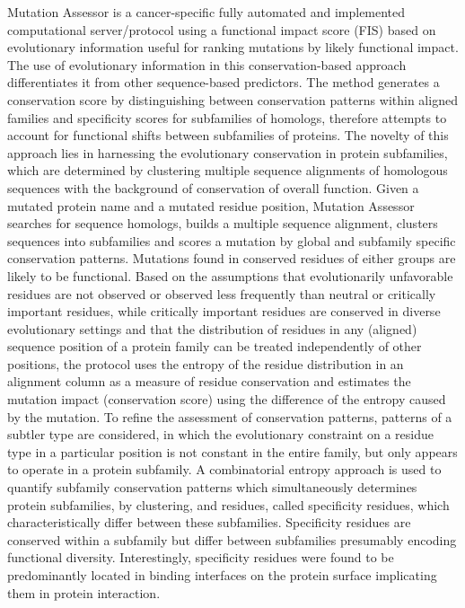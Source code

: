 \documentclass{article}
\begin{document}
Mutation Assessor is a cancer-specific fully automated and implemented
computational server/protocol using a functional impact score (FIS)
based on evolutionary information useful for ranking mutations by
likely functional impact. The use of evolutionary information in this
conservation-based approach differentiates it from other
sequence-based predictors.  The method generates a conservation score
by distinguishing between conservation patterns within aligned
families and specificity scores for subfamilies of homologs, therefore
attempts to account for functional shifts between subfamilies of
proteins. The novelty of this approach lies in harnessing the
evolutionary conservation in protein subfamilies, which are determined
by clustering multiple sequence alignments of homologous sequences
with the background of conservation of overall function. Given a
mutated protein name and a mutated residue position, Mutation Assessor
searches for sequence homologs, builds a multiple sequence alignment,
clusters sequences into subfamilies and scores a mutation by global
and subfamily specific conservation patterns. Mutations found in
conserved residues of either groups are likely to be functional. Based
on the assumptions that evolutionarily unfavorable residues are not
observed or observed less frequently than neutral or critically
important residues, while critically important residues are conserved
in diverse evolutionary settings and that the distribution of residues
in any (aligned) sequence position of a protein family can be treated
independently of other positions, the protocol uses the entropy of the
residue distribution in an alignment column as a measure of residue
conservation and estimates the mutation impact (conservation score)
using the difference of the entropy caused by the mutation. To refine
the assessment of conservation patterns, patterns of a subtler type
are considered, in which the evolutionary constraint on a residue type
in a particular position is not constant in the entire family, but
only appears to operate in a protein subfamily. A combinatorial
entropy approach is used to quantify subfamily conservation patterns
which simultaneously determines protein subfamilies, by clustering,
and residues, called specificity residues, which characteristically
differ between these subfamilies. Specificity residues are conserved
within a subfamily but differ between subfamilies presumably encoding
functional diversity. Interestingly, specificity residues were found
to be predominantly located in binding interfaces on the protein
surface implicating them in protein interaction.
\end{document}
